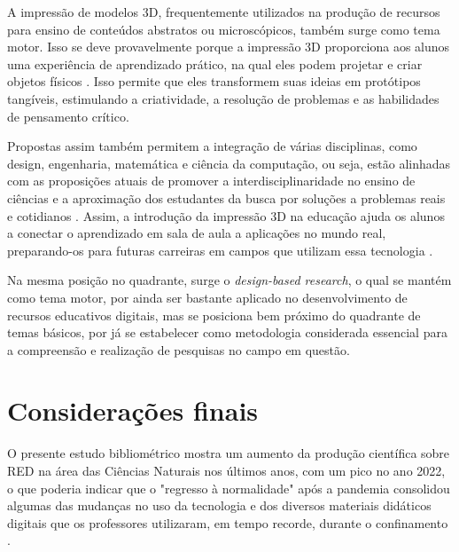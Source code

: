\documentclass[portuguese]{textolivre}
\begin{document}
A impressão de modelos 3D, frequentemente utilizados na produção de recursos para ensino de conteúdos abstratos ou microscópicos, também surge como tema motor. Isso se deve provavelmente porque a impressão 3D proporciona aos alunos uma experiência de aprendizado prático, na qual eles podem projetar e criar objetos físicos \cite{pernaa_systematic_2020}. Isso permite que eles transformem suas ideias em protótipos tangíveis, estimulando a criatividade, a resolução de problemas e as habilidades de pensamento crítico.

Propostas assim também permitem a integração de várias disciplinas, como design, engenharia, matemática e ciência da computação, ou seja, estão alinhadas com as proposições atuais de promover a interdisciplinaridade no ensino de ciências e a aproximação dos estudantes da busca por soluções a problemas reais e cotidianos \cite{hansen_exploring_2020}. Assim, a introdução da impressão 3D na educação ajuda os alunos a conectar o aprendizado em sala de aula a aplicações no mundo real, preparando-os para futuras carreiras em campos que utilizam essa tecnologia \cite{pernaa_systematic_2020}.

Na mesma posição no quadrante, surge o \textit{design-based research}, o qual se mantém como tema motor, por ainda ser bastante aplicado no desenvolvimento de recursos educativos digitais, mas se posiciona bem próximo do quadrante de temas básicos, por já se estabelecer como metodologia considerada essencial para a compreensão e realização de pesquisas no campo em questão.

\section{Considerações finais}

O presente estudo bibliométrico mostra um aumento da produção científica sobre RED na área das Ciências Naturais nos últimos anos, com um pico no ano 2022, o que poderia indicar que o "regresso à normalidade" após a pandemia consolidou algumas das mudanças no uso da tecnologia e dos diversos materiais didáticos digitais que os professores utilizaram, em tempo recorde, durante o confinamento \cite{rodriguez_materiales_2020}.
\end{document}
